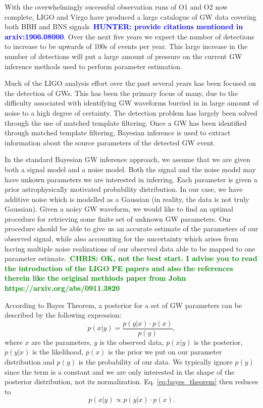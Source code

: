 \documentclass[%
showpacs,
 amsmath,amssymb,
 aps,
 twocolumn,
 prl,
 reprint,
floatfix,
]{revtex4-1}
\newcommand{\chris}[1]{\textbf{\textcolor{green}{CHRIS: #1}}}
\newcommand{\hunter}[1]{\textbf{\textcolor{blue}{HUNTER: #1}}}
\begin{document}
%
%
With the overwhelmingly successful observation runs of O1 and O2 
now complete, \ac{LIGO} and Virgo have produced a large 
catalogue of \ac{GW} data covering both \ac{BBH} and {BNS} signals~\hunter{provide 
citations mentioned in arxiv:1906.08000}. Over the next five years 
we expect the number of detections to increase to be upwards 
of 100s of events per year. This large increase in the number 
of detections will put a large amount of pressure on the current \ac{GW} inference 
methods used to perform parameter estimation.  

%
%
Much of the \ac{LIGO} analysis effort over the past several years has been focused 
on the detection of \ac{GW}s. This has been the primary 
focus of many, due to the difficulty associated 
with identifying \ac{GW} waveforms burried in 
in large amount of noise to a high degree of certainty. The detection problem has largely 
been solved through the use of matched template filtering\cite{0264-9381-33-21-215004}. 
Once a \ac{GW} has been identified through matched template filtering, Bayesian inference 
is used to extract information about the source 
parameters of the detected \ac{GW} event.

%
%
In the standard Bayesian \ac{GW} inference approach, we assume that we are
given both a signal model and a noise model. Both the signal and the 
noise model may have unkown parameters we are interested in inferring. 
Each parameter is given a prior astrophysically motivated probability 
distribution. In our case, we have additive noise which is modelled as 
a Gaussian (in reality, the data is not truly Gaussian). Given a noisy
\ac{GW} waveform, we would like to find an optimal procedure for retrieving
some finite set of unknown GW parameters. Our procedure should be able
to give us an accurate estimate of the parameters of our observed signal, while
also accounting for the uncertainty which arises from having multiple noise
realizations of our observed data able to be mapped to one parameter
estimate.~\chris{OK, not the best start. I advise you to read the introduction
of the LIGO PE papers and also the references therein like the original
methiods paper from John https://arxiv.org/abs/0911.3820}

%
%
According to Bayes Theorem, a posterior for a set of GW parameters can be described by the
following expression:
%
\begin{equation}
    p(x|y) = \frac{p(y|x) \cdot p(x)}{p(y)},\label{eq:bayes_theorem}
\end{equation}
%
where $x$ are the parameters, $y$ is the observed data, 
$p(x|y)$ is the posterior, $p(y|x)$ is the likelihood,
$p(x)$ is the prior we put on our parameter distribution and $p(y)$ is the
probability of our data.  We typically ignore $p(y)$ since the term is a 
constant and we are only interested in the shape of the posterior distribution, 
not its normalization. Eq. \ref{eq:bayes_theorem} then reduces
to
%
\begin{equation}
    p(x|y) \propto p(y|x) \cdot p(x).\label{eq:simplified_bayes}
\end{equation}
\end{document}
